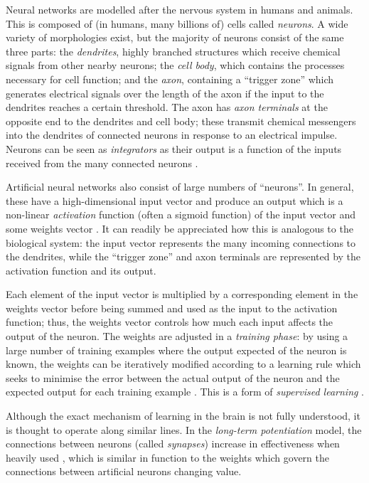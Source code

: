 Neural networks are modelled after the nervous system in humans and animals.  This is composed of (in humans, many billions of) cells called \emph{neurons}.  A wide variety of morphologies exist, but the majority of neurons consist of the same three parts: the \emph{dendrites}, highly branched structures which receive chemical signals from other nearby neurons; the \emph{cell body}, which contains the processes necessary for cell function; and the \emph{axon}, containing a ``trigger zone'' which generates electrical signals over the length of the axon if the input to the dendrites reaches a certain threshold.  The axon has \emph{axon terminals} at the opposite end to the dendrites and cell body; these transmit chemical messengers into the dendrites of connected neurons in response to an electrical impulse.  Neurons can be seen as \emph{integrators} as their output is a function of the inputs received from the many connected neurons \cite[p. 152]{Vander}.

Artificial neural networks also consist of large numbers of ``neurons''.  In general, these have a high-dimensional input vector and produce an output which is a non-linear \emph{activation} function (often a sigmoid function) of the input vector and some weights vector \cite[p. 1]{Annema1995}.  It can readily be appreciated how this is analogous to the biological system: the input vector represents the many incoming connections to the dendrites, while the ``trigger zone'' and axon terminals are represented by the activation function and its output.

Each element of the input vector is multiplied by a corresponding element in the weights vector before being summed and used as the input to the activation function; thus, the weights vector controls how much each input affects the output of the neuron.  The weights are adjusted in a \emph{training phase}: by using a large number of training examples where the output expected of the neuron is known, the weights can be iteratively modified according to a learning rule which seeks to minimise the error between the actual output of the neuron and the expected output for each training example \cite[p. 1]{Annema1995}.  This is a form of \emph{supervised learning} .

Although the exact mechanism of learning in the brain is not fully understood, it is thought to operate along similar lines.  In the \emph{long-term potentiation} model, the connections between neurons (called \emph{synapses}) increase in effectiveness when heavily used \cite[p. 271]{Vander}, which is similar in function to the weights which govern the connections between artificial neurons changing value.

